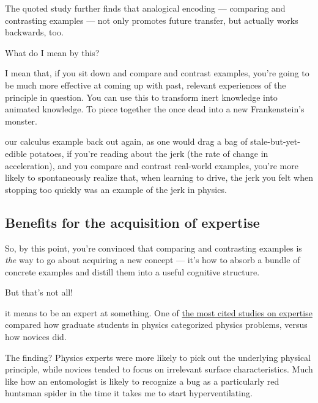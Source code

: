 The quoted study further finds that analogical encoding --- comparing and
contrasting examples --- not only promotes future transfer, but actually
works backwards, too.

What do I mean by this?

I mean that, if you sit down and compare and
contrast examples, you're going to be much more effective at coming up
with past, relevant experiences of the principle in question. You can
use this to transform inert knowledge into animated knowledge. To piece
together the once dead into a new Frankenstein's monster.

 our calculus example back out again, as one would drag a
bag of stale-but-yet-edible potatoes, if you're reading about the jerk (the
rate of change in acceleration), and you compare and contrast real-world
examples, you're more likely to spontaneously realize that, when
learning to drive, the jerk you felt when stopping too quickly was an
example of the jerk in physics.

\subsection{Benefits for the acquisition of
expertise}\label{benefits-for-the-acquistion-of-expertise}

So, by this point, you're convinced that comparing and
contrasting examples is \emph{the} way to go about acquiring a new
concept --- it's how to absorb a bundle of concrete examples and distill
them into a useful cognitive structure.

But that's not all!

 it means
to be an expert at something. One of
\href{http://eric.ed.gov/?id=ED215899}{the most cited studies on
expertise} compared how graduate students in physics categorized physics
problems, versus how novices did.

The finding? Physics experts were more likely to pick out the underlying
physical principle, while novices tended to focus on irrelevant surface
characteristics. Much like how an entomologist is likely to recognize a bug as a
particularly red huntsman spider in the time it takes me to start
hyperventilating.

